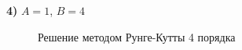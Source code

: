 	
		\newpage
		\thispagestyle{empty}
		\begin{landscape}
			\textbf{4)} $A = 1$, $B = 4$	
			\begin{figure}[h!]
				\begin{minipage}[h]{0.55\linewidth}
				\end{minipage}
				\hfill
				\begin{minipage}[h]{0.55\linewidth}
				\end{minipage}
				\caption{Решение методом Рунге-Кутты 4 порядка}
			\end{figure}
			\fillandplacepagenumber
		\end{landscape}
		
